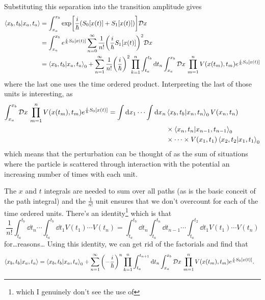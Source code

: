 \documentclass[]{revision-notes}
\begin{document}
Substituting this separation into the transition amplitude gives
\begin{align*}
  \braket{x_b, t_b}{x_a, t_a} &= \int_{x_a}^{x_b} \exp[\frac{i}{\hbar}(S_0[x(t)] + S_1[x(t)])] \mathcal{D} x\,\\
  &=  \int_{x_a}^{x_b} e^{\frac{i}{\hbar}S_0[x(t)]}\sum_{n=0}^\infty \frac{1}{n!}\qty(\frac{i}{\hbar}S_1[x(t)])^2 \mathcal{D} x\,\\
  &= \braket{x_b, t_b}{x_a, t_a}_0 + \sum_{n=1}^\infty  \frac{1}{n!}\qty(\frac{i}{\hbar})^2 \prod_{k=1}^{n} \int_{t_a}^{t_b} \dd{t_n} \int_{x_a}^{x_b} \mathcal{D} x\, \prod_{m=1}^{n}V(x(t_m), t_m) e^{\frac{i}{\hbar} S_0[x(t)] }
\end{align*}
where the last one uses the time ordered product.
Interpreting the last of those units is interesting, as
\begin{align*}
  \int_{x_a}^{x_b} \mathcal{D} x\, \prod_{m=1}^{n}V(x(t_m), t_m) e^{\frac{i}{\hbar} S_0[x(t)] } = \int \dd{x_1} \cdots \int \dd{x_n} &\braket{x_b, t_b}{x_{n}, t_{n}}_0 V(x_n, t_n)  \\
  &\times \braket{x_{n}, t_{n}}{x_{n-1}, t_{n-1}}_0 \\
  & \times \cdots \times V(x_1, t_1) \braket{x_{2}, t_{2}}{x_{1}, t_{1}}_0
\end{align*}
which means that the perturbation can be thought of as the sum of situations where the particle is scattered through interaction with the potential an increasing number of times with each unit.

The \(x\) and \(t\) integrals are needed to sum over all paths (as is the basic conceit of the path integral) and the \( \frac{1}{n!}\) unit ensures that we don't overcount for each of the time ordered units.
There's an identity\footnote{which I genuinely don't see the use of} which is that
\begin{equation*}
  \frac{1}{n!}\int_{t_a}^{t_b} \dd{t_n} \cdots \int_{t_a}^{t_b} \dd{t_1} V(t_1) \cdots V(t_n) = \int_{t_a}^{t_b} \dd{t_n} \int_{t_a}^{t_n} \dd{t_{n-1}} \cdots \int_{t_a}^{t_2} \dd{t_1} V(t_1) \cdots V(t_n)
\end{equation*}
for\ldots reasons\ldots
Using this identity, we can get rid of the factorials and find that
\begin{align*}
    \braket{x_b, t_b}{x_a, t_a} &= \braket{x_b, t_b}{x_a, t_a}_0 + \sum_{n=1}^\infty \qty(-\frac{i}{\hbar})^n \prod_{k=1}^{n} \int_{t_a}^{t_{n+1}} \dd{t_n} \int_{x_a}^{x_b} \mathcal{D} x\, \prod_{m=1}^{n}V(x(t_m), t_m) e^{\frac{i}{\hbar} S_0[x(t)] }.
\end{align*}
\end{document}
